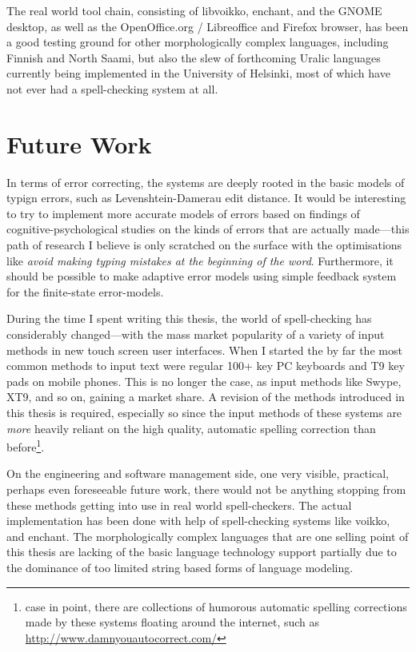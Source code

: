 \documentclass[officiallayout,draft]{unihelcompling}
\begin{document}
The real world tool chain, consisting of libvoikko, enchant, and the GNOME
desktop, as well as the OpenOffice.org / Libreoffice and Firefox browser, has
been a good testing ground for other morphologically complex languages,
including Finnish and North Saami, but also the slew of forthcoming Uralic
languages currently being implemented in the University of Helsinki, most of
which have not ever had a spell-checking system at all. 

\section{Future Work}
\label{sec:future-work}

In terms of error correcting, the systems are deeply rooted in the basic models
of typign errors, such as Levenshtein-Damerau edit distance. It would be
interesting to try to implement more accurate models of errors based on
findings of cognitive-psychological studies on the kinds of errors that are
actually made---this path of research I believe is only scratched on the
surface with the optimisations like \emph{avoid making typing mistakes at the
beginning of the word}. Furthermore, it should be possible to make adaptive
error models using simple feedback system for the finite-state error-models.

During the time I spent writing this thesis, the world of spell-checking has
considerably changed---with the mass market popularity of a variety of input
methods in new touch screen user interfaces. When I started the by far the most
common methods to input text were regular 100+ key PC keyboards and T9 key pads
on mobile phones. This is no longer the case, as input methods like Swype, XT9,
and so on, gaining a market share. A revision of the methods introduced in this
thesis is required, especially so since the input methods of these systems are
\emph{more} heavily reliant on the high quality, automatic spelling correction
than before\footnote{case in point, there are collections of humorous automatic
    spelling corrections made by these systems floating around the internet,
such as \url{http://www.damnyouautocorrect.com/}}.

On the engineering and software management side, one very visible, practical,
perhaps even foreseeable future work, there would not be anything stopping from
these methods getting into use in real world spell-checkers. The actual
implementation has been done with help of spell-checking systems like voikko,
and enchant. The morphologically complex languages that are one selling point
of this thesis are lacking of the basic language technology support partially
due to the dominance of too limited string based forms of language modeling.
\end{document}
